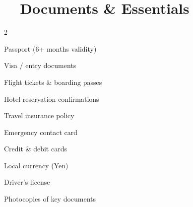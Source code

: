 \section{\faFile\ \ Documents \& Essentials}

\begin{multicols}{2}
\begin{checklist}
  \item Passport (6+ months validity)
  \item Visa / entry documents
  \item Flight tickets \& boarding passes
  \item Hotel reservation confirmations
  \item Travel insurance policy
  \item Emergency contact card
  \item Credit \& debit cards
  \item Local currency (Yen)
  \item Driver's license
  \item Photocopies of key documents
\end{checklist}
\end{multicols}

